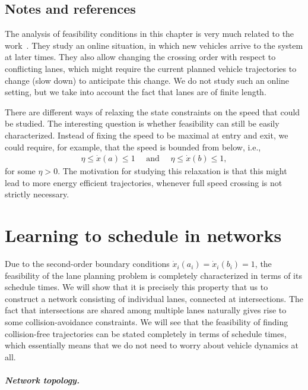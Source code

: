 \documentclass[a4paper]{report}
\theoremstyle{definition}
\theoremstyle{plain}
\begin{document}
\section{Notes and references}

The analysis of feasibility conditions in this chapter is very much related to
the work~\cite{miculescuPollingsystemsbasedAutonomousVehicle2016}.
%
They study an online situation, in which new vehicles arrive to the system at
later times.
%
They also allow changing the crossing order with respect to conflicting lanes,
which might require the current planned vehicle trajectories to change (slow
down) to anticipate this change.
%
We do not study such an online setting, but we take into account the fact that
lanes are of finite length.

There are different ways of relaxing the state constraints on the speed that
could be studied.
%
The interesting question is whether feasibility can still be easily characterized.
%
Instead of fixing the speed to be maximal at entry and exit, we could
require, for example, that the speed is bounded from below, i.e.,
\begin{align}
  \label{eq:1}
  \eta \leq \dot{x}(a) \leq 1 \quad \text{ and } \quad \eta \leq \dot{x}(b) \leq 1 ,
\end{align}
for some $\eta > 0$.
%
The motivation for studying this relaxation is that this might lead to more
energy efficient trajectories, whenever full speed crossing is not strictly
necessary.

\chapter{Learning to schedule in networks}\label{chap:network-learning}

Due to the second-order boundary conditions
$\dot{x}_{i}(a_{i}) = \dot{x}_{i}(b_{i}) = 1$, the feasibility of the lane
planning problem is completely characterized in terms of its schedule times.
%
We will show that it is precisely this property that us to construct a network
consisting of individual lanes, connected at intersections.
%
The fact that intersections are shared among multiple lanes naturally gives rise to some collision-avoidance constraints.
%
We will see that the feasibility of finding collision-free trajectories can be
stated completely in terms of schedule times, which essentially means that we do
not need to worry about vehicle dynamics at all.

\paragraph{Network topology.}
\end{document}
